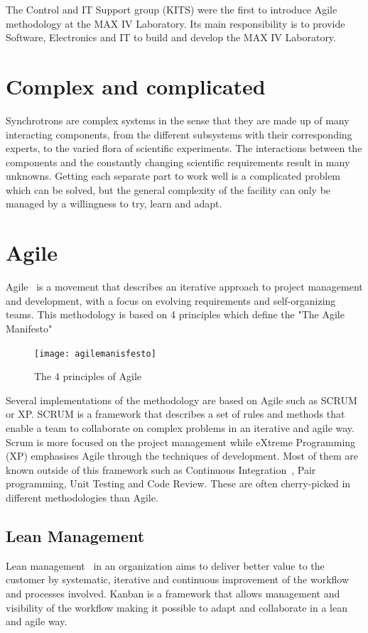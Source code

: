\documentclass[a4paper,
              ]{jacow}
\begin{document}
The Control and IT Support group (KITS) were the first to introduce Agile methodology at the MAX IV Laboratory. Its main responsibility is to provide Software, Electronics and IT to build and develop the MAX IV Laboratory.

\section{Complex and complicated}
Synchrotrons are complex systems in the sense that they are made up of many interacting components, from the different subsystems with their corresponding experts, to the varied flora of scientific experiments. The interactions between the components and the constantly changing scientific requirements result in many unknowns. Getting each separate part to work well is a complicated problem which can be solved, but the general complexity of the facility can only be managed by a willingness to try, learn and adapt.

\section{Agile}
Agile~\cite{agile} is a movement that describes an iterative approach to project management and development, with a focus on evolving requirements and self-organizing teams. This methodology is based on 4 principles which define the "The Agile Manifesto"

\begin{figure}[!tbh]
    \centering
    \texttt{[image: agilemanisfesto]}

    \caption{The 4 principles of Agile}
    \label{agilemanisfesto}
\end{figure}

Several implementations of the methodology are based on Agile such as SCRUM or XP.
SCRUM is a framework that describes a set of rules and methods that enable a team to collaborate on complex problems in an iterative and agile way. Scrum is more focused on the project management while
eXtreme Programming (XP) emphasises Agile through the techniques of development. Most of them are known outside of this framework such as Continuous Integration~\cite{vincent-ci-soleil}, Pair programming, Unit Testing and Code Review. These are often cherry-picked in different methodologies than Agile.

\subsection{Lean Management}
Lean management~\cite{lean} in an organization aims to deliver better value to the customer by systematic, iterative and continuous improvement of the workflow and processes involved.
Kanban is a framework that allows management and visibility of the workflow making it possible to adapt and collaborate in a lean and agile way.
\end{document}
